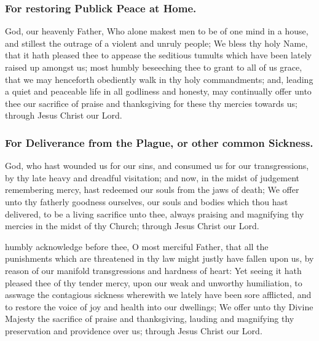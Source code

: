 \subsubsection{For restoring Publick Peace at Home.}
 God, our heavenly Father, Who alone makest men to be of one mind in a house, and stillest the outrage of a violent and unruly people; We bless thy holy Name, that it hath pleased thee to appease the seditious tumults which have been lately raised up amongst us; most humbly beseeching thee to grant to all of us grace, that we may henceforth obediently walk in thy holy commandments; and, leading a quiet and peaceable life in all godliness and honesty, may continually offer unto thee our sacrifice of praise and thanksgiving for these thy mercies towards us; through Jesus Christ our Lord.

\subsubsection{For Deliverance from the Plague, or other common Sickness.}
 God, who hast wounded us for our sins, and consumed us for our transgressions, by thy late heavy and dreadful visitation; and now, in the midst of judgement remembering mercy, hast redeemed our souls from the jaws of death; We offer unto thy fatherly goodness ourselves, our souls and bodies which thou hast delivered, to be a living sacrifice unto thee, always praising and magnifying thy mercies in the midst of thy Church; through Jesus Christ our Lord.

 humbly acknowledge before thee, O most merciful Father, that all the punishments which are threatened in thy law might justly have fallen upon us, by reason of our manifold transgressions and hardness of heart: Yet seeing it hath pleased thee of thy tender mercy, upon our weak and unworthy humiliation, to asswage the contagious sickness wherewith we lately have been sore afflicted, and to restore the voice of joy and health into our dwellings; We offer unto thy Divine Majesty the sacrifice of praise and thanksgiving, lauding and magnifying thy preservation and providence over us; through Jesus Christ our Lord.

\clearpage
